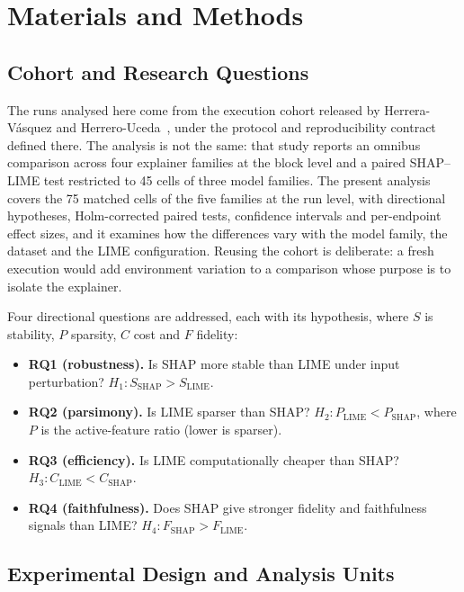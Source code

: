 \documentclass[11pt,a4paper]{article}
\begin{document}
\section{Materials and Methods}
\label{sec:methods}

\subsection{Cohort and Research Questions}
\label{sec:rqs}

The runs analysed here come from the execution cohort released by
Herrera-V\'asquez and Herrero-Uceda~\cite{herrera2026framework}, under the
protocol and reproducibility contract defined there. The analysis is not
the same: that study reports an omnibus comparison across four explainer
families at the block level and a paired SHAP--LIME test restricted to 45
cells of three model families. The present analysis covers the 75 matched
cells of the five families at the run level, with directional hypotheses,
Holm-corrected paired tests, confidence intervals and per-endpoint effect
sizes, and it examines how the differences vary with the model family, the
dataset and the LIME configuration. Reusing the cohort is deliberate: a fresh
execution would add environment variation to a comparison whose purpose is
to isolate the explainer.

Four directional questions are addressed, each with its hypothesis, where
$S$ is stability, $P$ sparsity, $C$ cost and $F$ fidelity:
\begin{itemize}
\item \textbf{RQ1 (robustness).} Is SHAP more stable than LIME under input
perturbation? $H_1: S_{\mathrm{SHAP}} > S_{\mathrm{LIME}}$.
\item \textbf{RQ2 (parsimony).} Is LIME sparser than SHAP?
$H_2: P_{\mathrm{LIME}} < P_{\mathrm{SHAP}}$, where $P$ is the
active-feature ratio (lower is sparser).
\item \textbf{RQ3 (efficiency).} Is LIME computationally cheaper than SHAP?
$H_3: C_{\mathrm{LIME}} < C_{\mathrm{SHAP}}$.
\item \textbf{RQ4 (faithfulness).} Does SHAP give stronger fidelity and
faithfulness signals than LIME? $H_4: F_{\mathrm{SHAP}} > F_{\mathrm{LIME}}$.
\end{itemize}

\subsection{Experimental Design and Analysis Units}
\label{sec:design}
\end{document}
